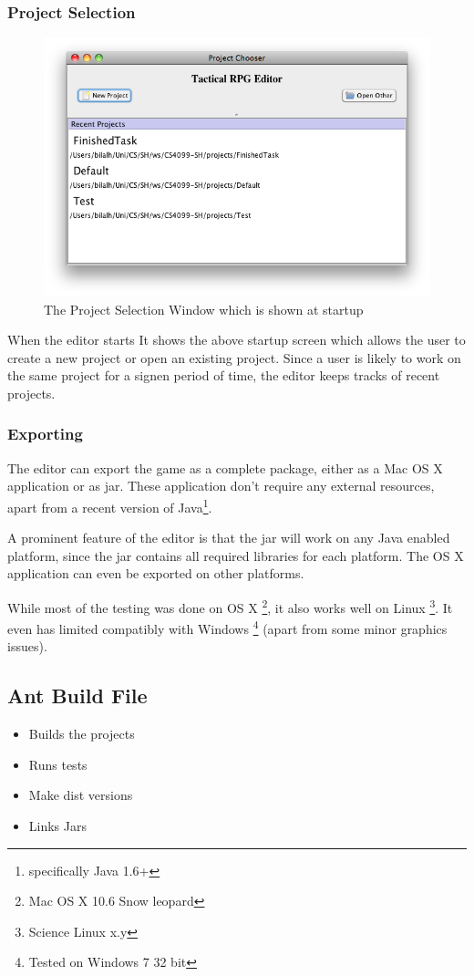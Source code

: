 \subsubsection{Project Selection}
\begin{figure}[htbp]
	\centering
		\includegraphics[width=1.05\textwidth]{figures/editor/Project_Selection.png}
	\caption{The Project Selection Window which is shown at startup}
	\label{fig:figures_editor_Project_Selection}
\end{figure}

When the editor starts It shows the above startup screen which allows the user to create a new project or open an existing project.  Since a user is likely to work on the same project for a signen period of time, the editor keeps tracks of recent projects. 

\clearpage
\subsubsection{Exporting}
\label{ssub:exporting}

The editor can export the game as a complete package, either as a Mac OS X application or as jar. These application don't require any external resources, apart from a recent version of Java\footnote{specifically Java 1.6+}.

A prominent feature of the editor is that the jar will work on any Java enabled platform, since the jar contains all required libraries for each platform. The OS X application can even be exported on other platforms.

While most of the testing was done on OS X \footnote{Mac OS X 10.6 Snow leopard}, it also works well on Linux \footnote{Science  Linux x.y}. It  even has limited compatibly with Windows \footnote{Tested on Windows 7 32 bit} (apart from some minor graphics issues).

\subsection{Ant Build File}
\begin{itemize}
	\item Builds the projects
	\item Runs tests
	\item Make dist versions
	\item Links Jars
\end{itemize}